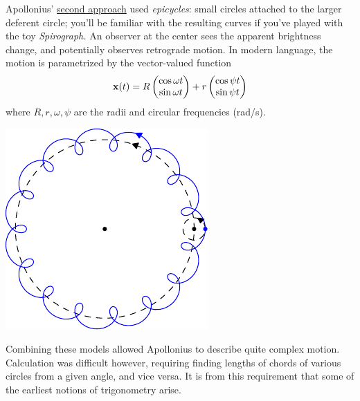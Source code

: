 \begin{minipage}[t]{0.68\linewidth}\vspace{0pt}
Apollonius' \href{http://brunelleschi.imss.fi.it/galileopalazzostrozzi/multimedia/ApolloniusEpicycles.html}{second approach} used \emph{epicycles}: small circles attached to the larger deferent circle; you'll be familiar with the resulting curves if you've played with the toy \emph{Spirograph.} An observer at the center sees the apparent brightness change, and potentially observes retrograde motion. In modern language, the motion is parametrized by the vector-valued function
\[{\mathbf{x}}(t)=R\begin{pmatrix}\cos \omega t\\\sin \omega t\end{pmatrix}+r\begin{pmatrix}\cos \psi t\\\sin \psi t\end{pmatrix}\]
where $R,r,\omega,\psi$ are the radii and circular frequencies (rad/s).
\end{minipage}\begin{minipage}[t]{0.32\linewidth}\vspace{0pt}
  \flushright\includegraphics{trig-epicycle1}
\end{minipage}\medbreak
  
Combining these models allowed Apollonius to describe quite complex motion. Calculation was difficult however, requiring finding lengths of chords of various circles from a given angle, and vice versa. It is from this requirement that some of the earliest notions of trigonometry arise.\smallbreak

